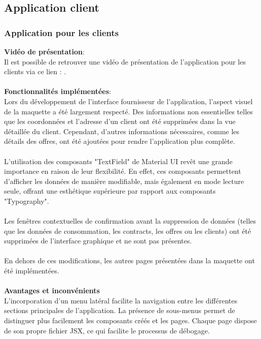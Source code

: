 \documentclass[../rapport.tex]{subfiles}
\begin{document}
\subsection{Application client}
\subsubsection{Application pour les clients}
\noindent \textbf{Vidéo de présentation}: \\ 
Il est possible de retrouver une vidéo de présentation de l'application pour les clients via ce lien : . \\ \\
\textbf{Fonctionnalités implémentées}: \\
Lors du développement de l'interface fournisseur de l'application, l'aspect visuel de la maquette a été largement respecté. Des informations non essentielles telles que les coordonnées et l'adresse d'un client ont été supprimées dans la vue détaillée du client. Cependant, d'autres informations nécessaires, comme les détails des offres, ont été ajoutées pour rendre l'application plus complète. \\ \\
L'utilisation des composants "TextField" de Material UI revêt une grande importance en raison de leur flexibilité. En effet, ces composants permettent d'afficher les données de manière modifiable, mais également en mode lecture seule, offrant une esthétique supérieure par rapport aux composants "Typography". \\ \\
Les fenêtres contextuelles de confirmation avant la suppression de données (telles que les données de consommation, les contracts, les offres ou les clients) ont été supprimées de l'interface graphique et ne sont pas présentes. \\ \\
En dehors de ces modifications, les autres pages présentées dans la maquette ont été implémentées.
\\ \\
\textbf{Avantages et inconvénients} \\
L'incorporation d'un menu latéral facilite la navigation entre les différentes sections principales de l'application. La présence de sous-menus permet de distinguer plus facilement les composants créés et les pages. Chaque page dispose de son propre fichier JSX, ce qui facilite le processus de débogage. \\ \\
\end{document}
